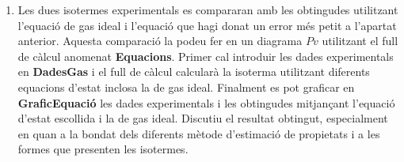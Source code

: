\documentclass[a4paper]{article}
\begin{document}
\begin{enumerate}[resume]
    \item Les dues isotermes experimentals es compararan amb les obtingudes utilitzant l’equació de gas ideal i l’equació que hagi donat un error més petit a l’apartat anterior. Aquesta comparació la podeu fer en un diagrama $Pv$ utilitzant el full de càlcul anomenat \textbf{Equacions}. Primer cal introduir les dades experimentals en \textbf{DadesGas} i el full de càlcul calcularà la isoterma utilitzant diferents equacions d’estat inclosa la de gas ideal. Finalment es pot graficar en \textbf{GraficEquació} les dades experimentals i les obtingudes mitjançant l’equació d’estat escollida i la de gas ideal. Discutiu el resultat obtingut, especialment en quan a la bondat dels diferents mètode d’estimació de propietats i a les formes que presenten les isotermes.
\end{enumerate}

\begin{figure}[H]
    \centering
\end{figure}
\end{document}
